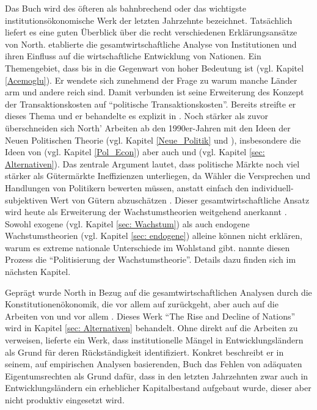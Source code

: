 Das Buch \textcite{North1990} wird des öfteren als bahnbrechend \parencite[S. 21]{Menard2010} oder das wichtigste institutionsökonomische Werk der letzten Jahrzehnte \parencite[S. 48]{Voigt2009} bezeichnet. Tatsächlich liefert es eine guten Überblick über die recht verschiedenen Erklärungsansätze von North. \textcite{North1990} etablierte die gesamtwirtschaftliche Analyse von Institutionen und ihren Einfluss auf die wirtschaftliche Entwicklung von Nationen. Ein Themengebiet, dass bis in die Gegenwart von hoher Bedeutung ist (vgl. Kapitel \ref{Acemoglu}). Er wendete sich zunehmend der Frage zu warum manche Länder arm und andere reich sind. Damit verbunden ist seine Erweiterung des Konzept der Transaktionskosten auf "`politische Transaktionskosten"'. Bereits \textcite{North1981} streifte er dieses Thema und er behandelte es explizit in \textcite{North1990a}. Noch stärker als zuvor überschneiden sich North' Arbeiten ab den 1990er-Jahren mit den Ideen der Neuen Politischen Theorie (vgl. Kapitel \ref{Neue_Politik} und \parencite{North1990a}), insbesondere die Ideen von \textcite{Buchanan1962} (vgl. Kapitel \ref{Pol_Econ}) aber auch \textcite{Olson1965} und \textcite{Ostrom1990} (vgl. Kapitel \ref{sec: Alternativen}). Das zentrale Argument lautet, dass politische Märkte noch viel stärker als Gütermärkte Ineffizienzen unterliegen, da Wähler die Versprechen und Handlungen von Politikern bewerten müssen, anstatt einfach den individuell-subjektiven Wert von Gütern abzuschätzen \parencite[S. 24]{Voigt2009}. Dieser gesamtwirtschaftliche Ansatz wird heute als Erweiterung der Wachstumstheorien weitgehend anerkannt \parencite[S. 635]{Snowdon2005}. Sowohl exogene (vgl. Kapitel \ref{sec: Wachstum}) als auch endogene Wachstumstheorien (vgl. Kapitel \ref{sec: endogene}) alleine können nicht erklären, warum es extreme nationale Unterschiede im Wohlstand gibt. \textcite{Hibbs2001} nannte diesen Prozess die "`Politisierung der Wachstumstheorie"'. Details dazu finden sich im nächsten Kapitel.

Geprägt wurde North in Bezug auf die gesamtwirtschaftlichen Analysen durch die Konstitutionenökonomik, die vor allem auf \textcite{Buchanan1962} zurückgeht, aber auch auf die Arbeiten von \textcite{Olson1965} und vor allem \textcite{Olson1982}. Dieses Werk "`The Rise and Decline of Nations"' wird in Kapitel \ref{sec: Alternativen} behandelt. Ohne direkt auf die Arbeiten zu verweisen, lieferte \textcite{Soto2000} ein Werk, dass institutionelle Mängel in Entwicklungsländern als Grund für deren Rückständigkeit identifiziert. Konkret beschreibt er in seinem, auf empirischen Analysen basierenden, Buch das Fehlen von adäquaten Eigentumsrechten als Grund dafür, dass in den letzten Jahrzehnten zwar auch in Entwicklungsländern ein erheblicher Kapitalbestand aufgebaut wurde, dieser aber nicht produktiv eingesetzt wird.

